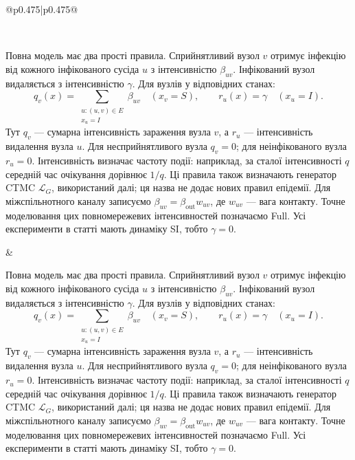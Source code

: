 \documentclass[11pt]{article}
\newcommand{\Full}{\textnormal{Full}}
\begin{document}
\begin{longtable}{@{}p{0.475\textwidth}|p{0.475\textwidth}@{}}
\begin{minipage}[t]{\linewidth}
\end{minipage} \\[5mm]
\begin{minipage}[t]{\linewidth}
Повна модель має два прості правила. Сприйнятливий вузол $v$ отримує інфекцію від кожного інфікованого сусіда $u$ з інтенсивністю $\beta_{uv}$. Інфікований вузол видаляється з інтенсивністю $\gamma$. Для вузлів у відповідних станах:
\begin{equation*}q_v(x)=\sum_{\substack{u:(u,v)\in E\\x_u=I}}\beta_{uv}
\quad (x_v=S),
\qquad r_u(x)=\gamma\quad (x_u=I).\tag{2}
\end{equation*}
Тут $q_v$ --- сумарна інтенсивність зараження вузла $v$, а $r_u$ --- інтенсивність видалення вузла $u$. Для несприйнятливого вузла $q_v=0$; для неінфікованого вузла $r_u=0$. Інтенсивність визначає частоту події: наприклад, за сталої інтенсивності $q$ середній час очікування дорівнює $1/q$. Ці правила також визначають генератор CTMC $\mathcal{L}_G$, використаний далі; ця назва не додає нових правил епідемії. Для міжспільнотного каналу записуємо $\beta_{uv}=\beta_{\mathrm{out}}w_{uv}$, де $w_{uv}$ --- вага контакту. Точне моделювання цих повномережевих інтенсивностей позначаємо \Full{}. Усі експерименти в статті мають динаміку SI, тобто $\gamma=0$.
\end{minipage} &
\begin{minipage}[t]{\linewidth}
Повна модель має два прості правила. Сприйнятливий вузол $v$ отримує інфекцію від кожного інфікованого сусіда $u$ з інтенсивністю $\beta_{uv}$. Інфікований вузол видаляється з інтенсивністю $\gamma$. Для вузлів у відповідних станах:
\begin{equation*}q_v(x)=\sum_{\substack{u:(u,v)\in E\\x_u=I}}\beta_{uv}
\quad (x_v=S),
\qquad r_u(x)=\gamma\quad (x_u=I).\tag{2}
\end{equation*}
Тут $q_v$ --- сумарна інтенсивність зараження вузла $v$, а $r_u$ --- інтенсивність видалення вузла $u$. Для несприйнятливого вузла $q_v=0$; для неінфікованого вузла $r_u=0$. Інтенсивність визначає частоту події: наприклад, за сталої інтенсивності $q$ середній час очікування дорівнює $1/q$. Ці правила також визначають генератор CTMC $\mathcal{L}_G$, використаний далі; ця назва не додає нових правил епідемії. Для міжспільнотного каналу записуємо $\beta_{uv}=\beta_{\mathrm{out}}w_{uv}$, де $w_{uv}$ --- вага контакту. Точне моделювання цих повномережевих інтенсивностей позначаємо \Full{}. Усі експерименти в статті мають динаміку SI, тобто $\gamma=0$.
\end{minipage} \\[5mm]
\begin{minipage}[t]{\linewidth}

\end{minipage}
\end{longtable}
\end{document}
